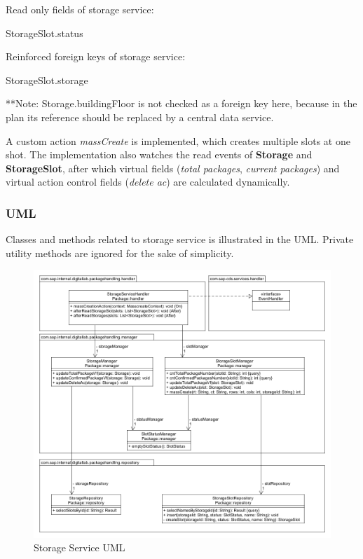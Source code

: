 \bigskip
Read only fields of storage service:
\begin{compactenum}
	\item StorageSlot.status
\end{compactenum}

\bigskip
Reinforced foreign keys of storage service:
\begin{compactenum}
	\item StorageSlot.storage
\end{compactenum}

\bigskip
**Note: Storage.buildingFloor is not checked as a foreign key here, because in the plan its reference should be replaced by a central data service.


A custom action \textit{massCreate} is implemented, which creates multiple slots at one shot. The implementation also watches the read events of \textbf{Storage} and \textbf{StorageSlot}, after which virtual fields (\textit{total packages}, \textit{current packages}) and virtual action control fields (\textit{delete ac}) are calculated dynamically.

\subsubsection{UML}

Classes and methods related to storage service is illustrated in the UML. Private utility methods are ignored for the sake of simplicity.
\begin{figure}
    \centering
    \includegraphics[width=1\linewidth]{images/service_class_diagrams/storage_service_class_diagram.png}
    \caption{Storage Service UML}
    \label{fig:storage_service_uml}
\end{figure}

